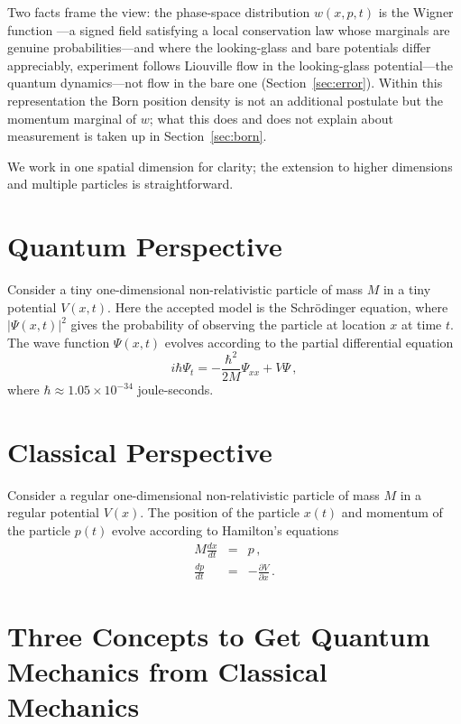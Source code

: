 \documentclass[12pt]{article}
\begin{document}
Two facts frame the view: the phase-space distribution $w(x,p,t)$ is the Wigner function \cite{wigner1932}---a signed field satisfying a local conservation law whose marginals are genuine probabilities---and where the looking-glass and bare potentials differ appreciably, experiment follows Liouville flow in the looking-glass potential---the quantum dynamics---not flow in the bare one (Section~\ref{sec:error}).
Within this representation the Born position density is not an additional postulate but the momentum marginal of $w$; what this does and does not explain about measurement is taken up in Section~\ref{sec:born}.

We work in one spatial dimension for clarity; the extension to higher dimensions and multiple particles is straightforward.

\section{Quantum Perspective}

Consider a tiny one-dimensional non-relativistic particle of mass $M$ in a tiny potential $V(x,t)$.
Here the accepted model is the Schr\"odinger equation, where $|\Psi(x,t)|^2$ gives the probability
of observing the particle at location $x$ at time $t$. The wave function $\Psi(x,t)$
evolves according to the partial differential equation \cite{landau1977}
\begin{equation}\label{eq:schrodinger}
i\hbar \Psi_t = -\frac{\hbar^2}{2M}\Psi_{xx} + V \Psi \,,
\end{equation}
where $\hbar \approx 1.05 \times 10^{-34}$ joule-seconds.

\section{Classical Perspective}

Consider a regular one-dimensional non-relativistic particle of mass $M$ in a regular potential $V(x)$.
The position of the particle $x(t)$ and momentum of the particle $p(t)$ evolve according to
Hamilton's equations \cite{goldstein2002}
\begin{eqnarray}
M \frac{dx}{dt} & = & p \,, \\
\frac{dp}{dt} & = & -\frac{\partial V}{\partial x} \,.
\end{eqnarray}

\section{Three Concepts to Get Quantum Mechanics from Classical Mechanics}
\end{document}
